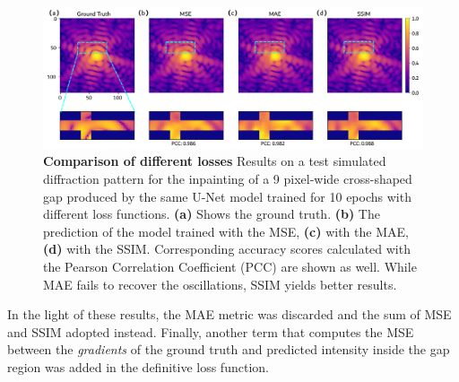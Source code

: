 \begin{figure}[h]
    \includegraphics[width=\textwidth]{figures/Inpainting/loss_comparison.pdf}
    \caption{\textbf{Comparison of different losses} Results on a test simulated diffraction pattern for the inpainting 
    of a 9 pixel-wide cross-shaped gap produced by the same U-Net model trained for 10 epochs with different loss functions. 
    \textbf{(a)} Shows the ground truth. \textbf{(b)} The prediction of the model trained with the MSE, \textbf{(c)} 
    with the MAE, \textbf{(d)} with the SSIM. Corresponding accuracy scores calculated with the Pearson Correlation 
    Coefficient (PCC) are shown as well. While MAE fails to recover the oscillations, SSIM yields better results.}
    \label{fig:loss_comparison_inpainting}
\end{figure}

In the light of these results, the MAE metric was discarded and the sum of MSE and SSIM adopted instead. 
Finally, another term that computes the MSE between the \textit{gradients} of the ground truth and predicted intensity inside
the gap region was added in the definitive loss function.\\

